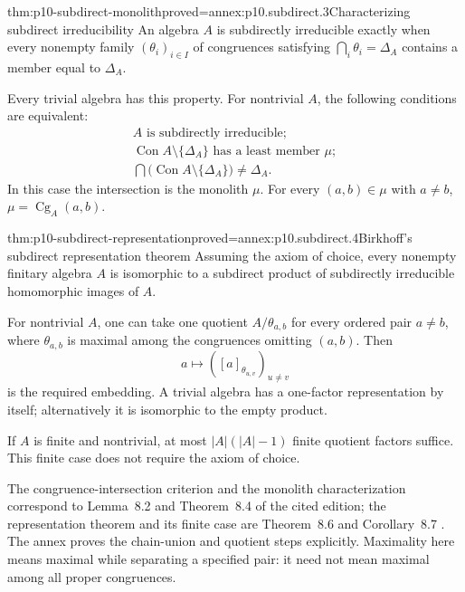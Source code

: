 \begin{hbtheorem}{thm:p10-subdirect-monolith}{proved=annex:p10.subdirect.3}{Characterizing subdirect irreducibility}
An algebra \(A\) is subdirectly irreducible exactly when every
nonempty family \((\theta_i)_{i\in I}\) of congruences satisfying
\(\bigcap_i\theta_i=\Delta_A\) contains a member equal to
\(\Delta_A\).

Every trivial algebra has this property.  For nontrivial \(A\),
the following conditions are equivalent:
\[
\begin{gathered}
 A\text{ is subdirectly irreducible};\\
 \operatorname{Con}A\setminus\{\Delta_A\}
                 \text{ has a least member }\mu;\\
 \bigcap\bigl(\operatorname{Con}A\setminus\{\Delta_A\}\bigr)
                       \ne\Delta_A.
\end{gathered}
\]
In this case the intersection is the monolith \(\mu\).
For every \((a,b)\in\mu\) with \(a\ne b\),
\(\mu=\operatorname{Cg}_A(a,b)\).
\end{hbtheorem}

\begin{hbtheorem}{thm:p10-subdirect-representation}{proved=annex:p10.subdirect.4}{Birkhoff's subdirect representation theorem}
Assuming the axiom of choice, every nonempty finitary algebra \(A\)
is isomorphic to a subdirect product of subdirectly irreducible
homomorphic images of \(A\).

For nontrivial \(A\), one can take one quotient \(A/\theta_{a,b}\)
for every ordered pair \(a\ne b\), where \(\theta_{a,b}\) is maximal
among the congruences omitting \((a,b)\).  Then
\[
 a\longmapsto([a]_{\theta_{u,v}})_{u\ne v}
\]
is the required embedding.  A trivial algebra has a one-factor
representation by itself; alternatively it is isomorphic to the
empty product.

If \(A\) is finite and nontrivial, at most
\(|A|(|A|-1)\) finite quotient factors suffice.  This finite case
does not require the axiom of choice.
\end{hbtheorem}

The congruence-intersection criterion and the monolith characterization
correspond to Lemma~8.2 and Theorem~8.4 of the cited edition;
the representation theorem and its finite case are Theorem~8.6 and
Corollary~8.7 \cite[Chapter~II, \S8, pp.~57--59]{BurrisSankappanavar2012}.
The annex proves the chain-union and quotient steps explicitly.
Maximality here means maximal while separating a specified pair:
it need not mean maximal among all proper congruences.

